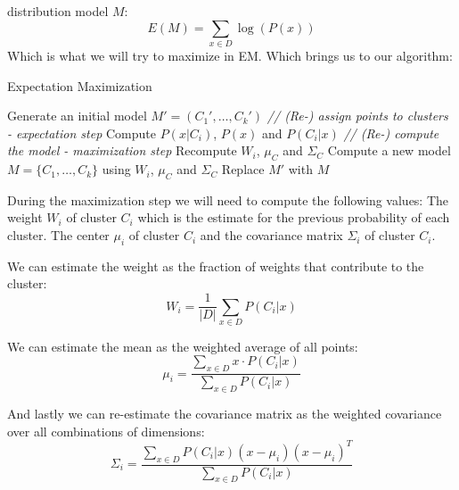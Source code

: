     distribution model $M$:
    \begin{equation*}
        E(M)=\sum_{x\in D} \log(P(x))
    \end{equation*}
    Which is what we will try to maximize in EM. Which brings us to our 
    algorithm:
    \begin{algorithm}
        \caption{Expectation Maximization}\label{alg:EM}
        \begin{algorithmic}
                \State Generate an initial model $M'=(C_1',\dots,C_k')$
                \Repeat
                    \State \textit{// (Re-) assign points to clusters - 
                    expectation step}
                            \State Compute $P(x|C_i)$, $P(x)$ and $P(C_i|x)$
                        \EndFor
                    \EndFor
                    \State \textit{// (Re-) compute the model - maximization 
                    step}
                        \State Recompute $W_i$, $\mu_C$ and $\Sigma_C$
                        \State Compute a new model $M=\{C_1,\dots,C_k\}$ using 
                        $W_i$, $\mu_C$ and $\Sigma_C$
                        \State Replace $M'$ with $M$
                    \EndFor
            \EndProcedure
        \end{algorithmic}
    \end{algorithm}
    
    During the maximization step we will need to compute the following values: 
    The weight $W_i$ of cluster $C_i$ which is the estimate for the previous 
    probability of each cluster. The center $\mu_i$ of cluster $C_i$ and the 
    covariance matrix $\Sigma_i$ of cluster $C_i$.
    
    We can estimate the weight as the fraction of weights that contribute to 
    the cluster:
    \begin{equation*}
        W_i=\frac{1}{|D|}\sum_{x\in D} P(C_i|x)
    \end{equation*}
    
    We can estimate the mean as the weighted average of all points:
    \begin{equation*}
        \mu_i=\frac{\sum_{x\in D}x \cdot P(C_i|x)}{\sum_{x\in D}P(C_i|x)}
    \end{equation*}
    
    And lastly we can re-estimate the covariance matrix as the weighted 
    covariance over all combinations of dimensions:
    \begin{equation*}
        \Sigma_i=\frac{\sum_{x \in D}P(C_i|x)(x-\mu_i)(x-\mu_i)^T}{\sum_{x \in 
        D}P(C_i|x)}
    \end{equation*}
    
